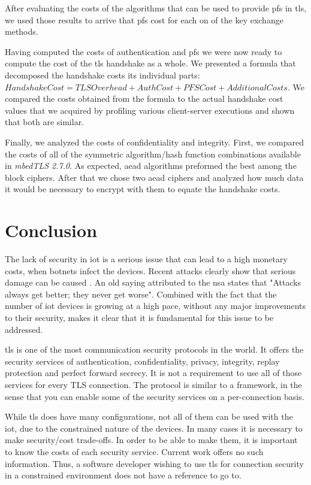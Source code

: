 \documentclass{llncs}
\begin{document}
After evaluating the costs of the algorithms that can be used to provide \gls{pfs} in \gls{tls}, we used those results
to arrive that \gls{pfs} cost for each on of the key exchange methods.

Having computed the costs of authentication and \gls{pfs} we were now ready to compute the cost of the \gls{tls} handshake
as a whole. We presented a formula that decomposed the handshake costs its individual parts: $Handshake Cost = TLS Overhead + Auth Cost + PFS Cost + Additional Costs$. 
We compared the costs
obtained from the formula to the actual handshake cost values that we acquired by profiling various client-server
executions and shown that both are similar.

Finally, we analyzed the costs of confidentiality and integrity. First, we compared the costs of all of the
symmetric algorithm/hash function combinations available in \textit{mbedTLS 2.7.0}. As expected,
\gls{aead} algorithms preformed the best among the block ciphers. After that we chose two \gls{aead} ciphers and
analyzed how much data it would be necessary to encrypt with them to equate the handshake costs.

\section{Conclusion}

The lack of security in \gls{iot} is a serious issue that can lead to a high monetary costs,
when botnets infect the devices. Recent
attacks clearly show that serious damage can be caused \cite{sec17ant94:online}. An old saying attributed to the
\gls{nsa} states that "Attacks always get better; they never get worse".
Combined with the fact that the number of \gls{iot} devices is growing at a high
pace, without any major improvements to their security, makes it clear
that it is fundamental for this issue to be addressed.

\gls{tls} is one of the most communication security protocols in the world. It offers the
security services of authentication, confidentiality, privacy, integrity, replay
protection and perfect forward secrecy. It is not a requirement to use all of
those services for every TLS connection. The protocol is similar to
a framework, in the sense that you can enable some of the security
services on a per-connection basis.

While \gls{tls} does have many configurations, not all of them can be used with the \gls{iot},
due to the constrained nature of the devices. In many cases it is necessary to make security/cost
trade-offs. In order to be able to make them, it is important to know the costs of each security
service. Current work offers no such information. Thus, a software developer wishing to use \gls{tls}
for connection security in a constrained environment does not have a reference to go to.
\end{document}
